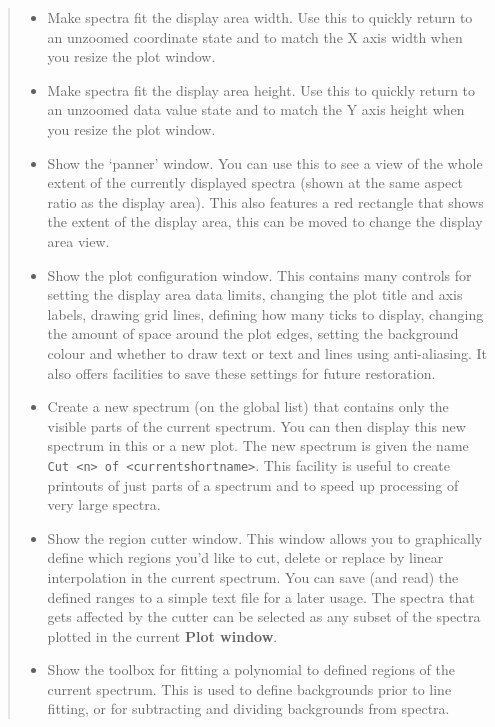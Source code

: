 \documentclass[twoside,11pt]{article}
\newcommand{\htmladdimg}[1]{}
\newcommand{\latexhtml}[2]{#1}
\renewcommand{\_}{\texttt{\symbol{95}}}
\newcommand{\inline}[1]
        {\latexhtml{\texttt{[image: sun243\_figures/\#1]}}
        {\htmladdimg[align=center]{#1.gif}}}
\newcommand{\labelitem}[1]{\textbf{#1}}
\newcommand{\hitext}[1]{\texttt{#1}}
\begin{document}
\begin{quote}
\begin{itemize}
  \item[\inline{fitwidth}] Make spectra fit the display area width.  Use this
  to quickly return to an unzoomed coordinate state and to match the X axis
  width when you resize the plot window.

  \item[\inline{fitheight}] Make spectra fit the display area height.  Use
  this to quickly return to an unzoomed data value state and to match the Y
  axis height when you resize the plot window.

  \item[\inline{panner}] Show the `panner' window. You can use this to
  see a view of the whole extent of the currently displayed spectra
  (shown at the same aspect ratio as the display area). This also
  features a red rectangle that shows the extent of the display area,
  this can be moved to change the display area view.

  \item[\inline{config}] Show the plot configuration window. This
  contains many controls for setting the display area data limits,
  changing the plot title and axis labels, drawing grid lines,
  defining how many ticks to display, changing the amount of space
  around the plot edges, setting the background colour and whether to
  draw text or text and lines using anti-aliasing. It also offers
  facilities to save these settings for future restoration.

  \item[\inline{cutter}] Create a new spectrum (on the global list)
  that contains only the visible parts of the current spectrum. You
  can then display this new spectrum in this or a new plot. The new
  spectrum is given the name \hitext{Cut <n> of <current\_shortname>}.
  This facility is useful to create printouts of just parts of a
  spectrum and to speed up processing of very large spectra.

  \item[\inline{regioncutter}] Show the region cutter window. This
  window allows you to graphically define which regions you'd like to
  cut, delete or replace by linear interpolation in the current spectrum.
  You can save (and read) the defined ranges to a simple text file for 
  a later usage. The spectra that gets affected by the cutter can be
  selected as any subset of the spectra plotted in the current
  \labelitem{Plot window}.

  \item[\inline{fitback}] Show the toolbox for fitting a polynomial to
  defined regions of the current spectrum. This is used to define
  backgrounds prior to line fitting, or for subtracting and dividing
  backgrounds from spectra.


\end{itemize}
\end{quote}
\end{document}
